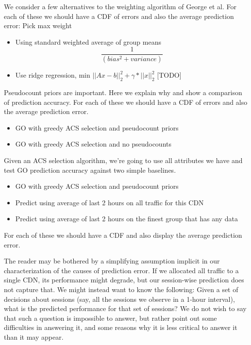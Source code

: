 
We consider a few alternatives to the weighting algorithm of George et al.  For each of these we should have a CDF of errors and also the average prediction error:
Pick max weight
\begin{itemize}
	\item Using standard weighted average of group means $$\frac{1}{(bias^2 + variance)}$$
	\item Use ridge regression, min $||Ax - b||_2^2 + \gamma*||x||_2^2$ [TODO]
\end{itemize}


Pseudocount priors are important.  Here we explain why and show a comparison of prediction accuracy.  For each of these we should have a CDF of errors and also the average prediction error.
\begin{itemize}
	\item GO with greedy ACS selection and pseudocount priors
	\item GO with greedy ACS selection and no pseudocounts
\end{itemize}

Given an ACS selection algorithm, we’re going to use all attributes we have and test GO prediction accuracy against two simple baselines.
\begin{itemize}
	\item GO with greedy ACS selection and pseudocount priors
	\item Predict using average of last 2 hours on all traffic for this CDN
	\item Predict using average of last 2 hours on the finest group that has any data
\end{itemize}
For each of these we should have a CDF and also display the average prediction error.


The reader may be bothered by a simplifying assumption implicit in our characterization of the causes of prediction error.  If we allocated all traffic to a single CDN, its performance might degrade, but our session-wise prediction does not capture that.  We might instead want to know the following: Given a set of decisions about sessions (say, all the sessions we observe in a 1-hour interval), what is the predicted performance for that set of sessions?  We do not wish to say that such a question is impossible to answer, but rather point out some difficulties in answering it, and some reasons why it is less critical to answer it than it may appear.

